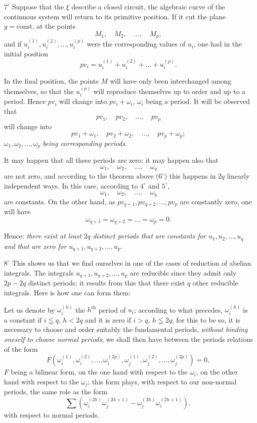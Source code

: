 \documentclass{article}
\begin{document}
$7^\circ$ Suppose that the $\xi$ describe a closed circuit, the algebraic curve of the continuous system will return to its primitive position. If it cut the plane $y = \mathrm{const.}$ at the points
\[
M_{1}, \quad M_{2}, \quad \ldots, \quad M_{p},
\]
and if $u_{i}^{(1)}, u_{i}^{(2)}, \ldots, u_{i}^{(p)}$ were the corresponding values of $u_{i}$, one had in the initial position
\[
p v_{i} = u_{i}^{(1)} + u_{i}^{(2)} + \ldots + u_{i}^{(p)}.
\]

In the final position, the points $M$ will have only been interchanged among themselves, so that the $u_{i}^{(p)}$ will reproduce themselves up to order and up to a period. Hence $p v_{i}$ will change into $p v_{i} + \omega_{i}$, $\omega_{i}$ being a period. It will be observed that
\[
p v_{1}, \quad p v_{2}, \quad \ldots, \quad p v_{p}
\]
will change into
\[
p v_{1} + \omega_{1}, \quad p v_{2} + \omega_{2}, \quad \ldots, \quad p v_{p} + \omega_{p};
\]
$\omega_{1}, \omega_{2}, \ldots, \omega_{p}$ \emph{being corresponding periods}.

It may happen that all these periods are zero; it may happen also that
\[
\omega_{1}, \quad \omega_{2}, \quad \ldots, \quad \omega_{q}
\]
are not zero, and according to the theorem above ($6^\circ$) this happens in $2q$ linearly independent ways. In this case, according to $4^\circ$ and $5^\circ$,
\[
\omega_{1}, \quad \omega_{2}, \quad \ldots, \quad \omega_{q}
\]
are constants. On the other hand, as $p v_{q+1}, p v_{q+2}, \ldots, p v_{p}$ are constantly zero, one will have
\[
\omega_{q+1} = \omega_{q+2} = \ldots = \omega_{p} = 0.
\]

Hence: \emph{there exist at least $2q$ distinct periods that are constants for $u_{1}, u_{2}, \ldots, u_{q}$ and that are zero for $u_{q+1}, u_{q+2}, \ldots, u_{p}$}.

$8^\circ$ This shows us that we find ourselves in one of the cases of reduction of abelian integrals. The integrals $u_{q+1}, u_{q+2}, \ldots, u_{p}$ are reducible since they admit only $2p - 2q$ distinct periods; it results from this that there exist $q$ other reducible integrals. Here is how one can form them:

Let us denote by $\omega_{i}^{(h)}$ the $h^{\text{th}}$ period of $u_{i}$; according to what precedes, $\omega_{i}^{(h)}$ is a constant if $i \leqq q$, $h < 2q$ and it is zero if $i > q$, $h \leqq 2q$; for this to be so, it is necessary to choose and order suitably the fundamental periods, \emph{without binding oneself to choose normal periods}; we shall then have between the periods relations of the form
\[
F(\omega_{i}^{(1)}, \omega_{i}^{(2)}, \ldots, \omega_{i}^{(2p)}, \omega_{j}^{(1)}, \omega_{j}^{(2)}, \ldots, \omega_{j}^{(2p)}) = 0,
\]
$F$ being a bilinear form, on the one hand with respect to the $\omega_{i}$, on the other hand with respect to the $\omega_{j}$; this form plays, with respect to our non-normal periods, the same role as the form
\[
\sum (\omega_{i}^{(2h)} \omega_{j}^{(2h+1)} - \omega_{j}^{(2h)} \omega_{i}^{(2h+1)}),
\]
with respect to normal periods.
\end{document}
